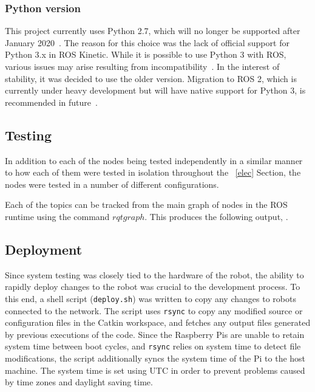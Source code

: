 \subsubsection{Python version}
This project currently uses Python 2.7, which will no longer be supported 
after January 2020~\cite{python2-eol}. The reason for this choice was the 
lack of official support for Python 3.x in ROS Kinetic. While it is 
possible to use Python 3 with ROS, various issues may arise resulting from 
incompatibility~\cite{medium-ros-python3}. In the interest of stability, 
it was decided to use the older version. Migration to ROS 2, which is 
currently under heavy development but will have native support for Python 
3, is recommended in future~\cite{ros2}.






\subsection{Testing}\label{soft/ROS/test}
In addition to each of the nodes being tested independently in a similar 
manner to how each of them were tested in isolation throughout the~
\ref{elec} Section, the nodes were tested in a number of different 
configurations.

Each of the topics can be tracked from the main graph of nodes in the ROS 
runtime using the command $rqt graph$. This produces the following output, 
.


\subsection{Deployment}\label{soft/ROS/deploy}
Since system testing was closely tied to the hardware of the robot, the 
ability to rapidly deploy changes to the robot was crucial to the 
development process. To this end, a shell script (\verb|deploy.sh|) was 
written to copy any changes to robots connected to the network. The script 
uses \verb|rsync| to copy any modified source or configuration files in 
the Catkin workspace, and fetches any output files generated by previous 
executions of the code. Since the Raspberry Pis are unable to retain 
system time between boot cycles, and \verb|rsync| relies on system time to 
detect file modifications, the script additionally syncs the system time 
of the Pi to the host machine. The system time is set using UTC in order 
to prevent problems caused by time zones and daylight saving time.

